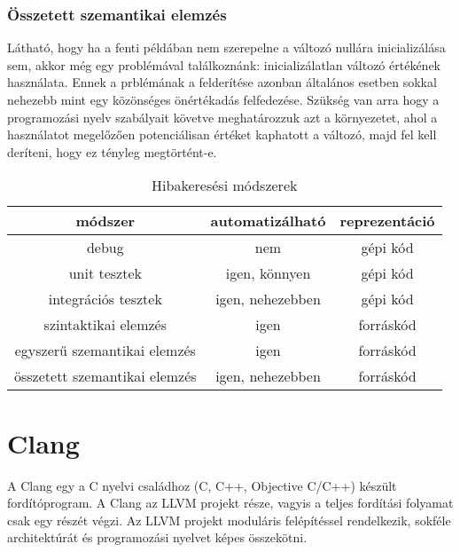 \documentclass[a4paper,12pt]{report}
\begin{document}
\subsection{Összetett szemantikai elemzés}
Látható, hogy ha a fenti példában nem szerepelne a változó nullára inicializálása sem, akkor még egy problémával találkoznánk: inicializálatlan változó értékének használata. Ennek a prblémának a felderítése azonban általános esetben sokkal nehezebb mint egy közönséges önértékadás felfedezése. Szükség van arra hogy a programozási nyelv szabályait követve meghatározzuk azt a környezetet, ahol a használatot megelőzően potenciálisan értéket kaphatott a változó, majd fel kell deríteni, hogy ez tényleg megtörtént-e.

\begin{table}[h!]
\centering
\begin{tabular}{||c c c||} 
 \hline
 módszer & automatizálható & reprezentáció \\
 \hline\hline
 debug & nem & gépi kód \\ 
 unit tesztek & igen, könnyen & gépi kód \\
 integrációs tesztek & igen, nehezebben & gépi kód \\
 szintaktikai elemzés & igen & forráskód \\ 
 egyszerű szemantikai elemzés & igen & forráskód \\
 összetett szemantikai elemzés & igen, nehezebben & forráskód \\
 \hline
\end{tabular}
\caption{Hibakeresési módszerek}
\label{table:errorfindmethods}
\end{table}

\chapter{Clang}
A Clang egy a C nyelvi családhoz (C, C++, Objective C/C++) készült fordítóprogram. A Clang az LLVM projekt része, vagyis a teljes fordítási folyamat csak egy részét végzi. Az LLVM projekt moduláris felépítéssel rendelkezik, sokféle architektúrát és programozási nyelvet képes összekötni.
\end{document}
